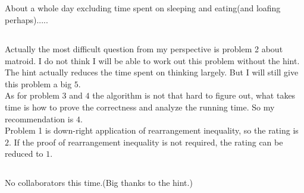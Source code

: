 \documentclass[12pt,letterpaper]{article}
\begin{document}
\subsection{}
About a whole day excluding time spent on sleeping and eating(and loafing perhaps).....
\subsection{}
Actually the most difficult question from my perspective is problem 2 about matroid. I do not think I will be able to work out this problem without the hint. The hint actually reduces the time spent on thinking largely. But I will still give this problem a big $5$.\\
As for problem $3$ and $4$ the algorithm is not that hard to figure out,
what takes time is how to prove the correctness and analyze the running time.
So my recommendation is $4$.\\
Problem 1 is down-right application of rearrangement inequality, so the rating is $2$.
If the proof of rearrangement inequality is not required, the rating can be reduced to $1$.
\subsection{}
No collaborators this time.(Big thanks to the hint.)
\end{document}
